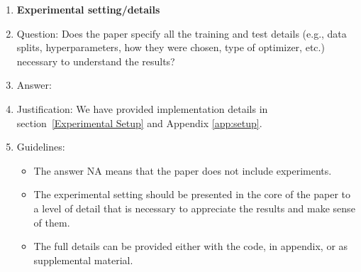 \documentclass{article}
\begin{document}
\begin{enumerate}
\item {\bf Experimental setting/details}
    \item[] Question: Does the paper specify all the training and test details (e.g., data splits, hyperparameters, how they were chosen, type of optimizer, etc.) necessary to understand the results?
    \item[] Answer: \answerYes{} %
    \item[] Justification: We have provided implementation details in section~\ref{Experimental Setup} and Appendix \ref{app:setup}.
    \item[] Guidelines:
    \begin{itemize}
        \item The answer NA means that the paper does not include experiments.
        \item The experimental setting should be presented in the core of the paper to a level of detail that is necessary to appreciate the results and make sense of them.
        \item The full details can be provided either with the code, in appendix, or as supplemental material.
    \end{itemize}


\end{enumerate}
\end{document}
